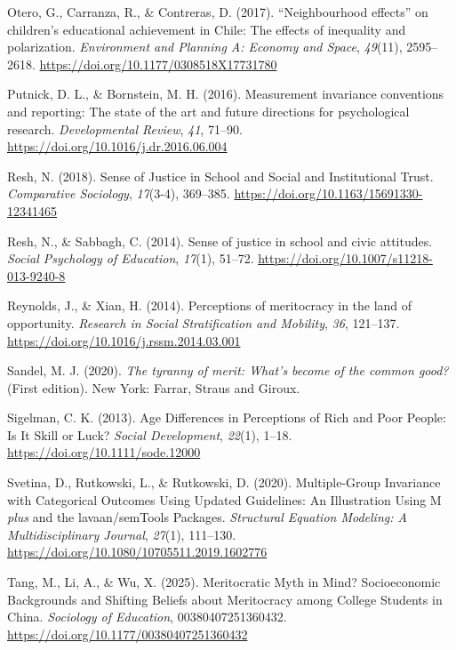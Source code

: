 \documentclass[
  13pt,
]{article}
\newlength{\cslhangindent}
\newenvironment{CSLReferences}[2] %
 {\begin{list}{}{%
  \setlength{\itemindent}{0pt}
  \setlength{\leftmargin}{0pt}
  \setlength{\parsep}{0pt}
  \ifodd #1
   \setlength{\leftmargin}{\cslhangindent}
   \setlength{\itemindent}{-1\cslhangindent}
  \fi
  \setlength{\itemsep}{#2\baselineskip}}}
 {\end{list}}
\begin{document}
\begin{CSLReferences}{1}{0}
Otero, G., Carranza, R., \& Contreras, D. (2017). {``{Neighbourhood}
effects''} on children's educational achievement in {Chile}: {The}
effects of inequality and polarization. \emph{Environment and Planning
A: Economy and Space}, \emph{49}(11), 2595--2618.
\url{https://doi.org/10.1177/0308518X17731780}

Putnick, D. L., \& Bornstein, M. H. (2016). Measurement invariance
conventions and reporting: {The} state of the art and future directions
for psychological research. \emph{Developmental Review}, \emph{41},
71--90. \url{https://doi.org/10.1016/j.dr.2016.06.004}

Resh, N. (2018). Sense of {Justice} in {School} and {Social} and
{Institutional Trust}. \emph{Comparative Sociology}, \emph{17}(3-4),
369--385. \url{https://doi.org/10.1163/15691330-12341465}

Resh, N., \& Sabbagh, C. (2014). Sense of justice in school and civic
attitudes. \emph{Social Psychology of Education}, \emph{17}(1), 51--72.
\url{https://doi.org/10.1007/s11218-013-9240-8}

Reynolds, J., \& Xian, H. (2014). Perceptions of meritocracy in the land
of opportunity. \emph{Research in Social Stratification and Mobility},
\emph{36}, 121--137. \url{https://doi.org/10.1016/j.rssm.2014.03.001}

Sandel, M. J. (2020). \emph{The tyranny of merit: {What}'s become of the
common good?} (First edition). New York: {Farrar, Straus and Giroux}.

Sigelman, C. K. (2013). Age {Differences} in {Perceptions} of {Rich} and
{Poor People}: {Is It Skill} or {Luck}? \emph{Social Development},
\emph{22}(1), 1--18. \url{https://doi.org/10.1111/sode.12000}

Svetina, D., Rutkowski, L., \& Rutkowski, D. (2020). Multiple-{Group
Invariance} with {Categorical Outcomes Using Updated Guidelines}: {An
Illustration Using M} {\emph{plus}} and the lavaan/{semTools Packages}.
\emph{Structural Equation Modeling: A Multidisciplinary Journal},
\emph{27}(1), 111--130.
\url{https://doi.org/10.1080/10705511.2019.1602776}

Tang, M., Li, A., \& Wu, X. (2025). Meritocratic {Myth} in {Mind}?
{Socioeconomic Backgrounds} and {Shifting Beliefs} about {Meritocracy}
among {College Students} in {China}. \emph{Sociology of Education},
00380407251360432. \url{https://doi.org/10.1177/00380407251360432}


\end{CSLReferences}
\end{document}
